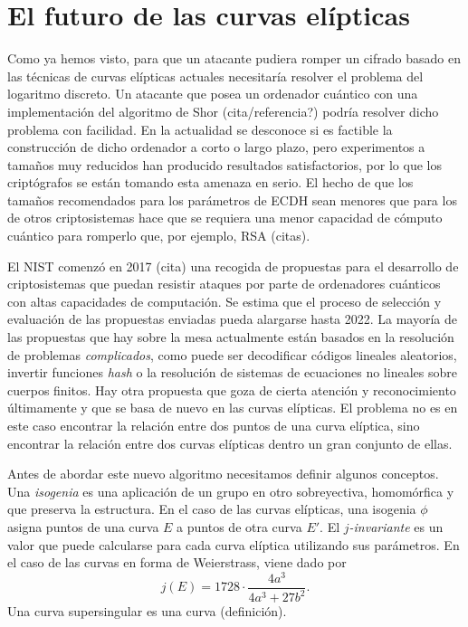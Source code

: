 \documentclass[
  a4paper,
  12pt,
  spanish,
]{scrartcl}
\begin{document}
\section{El futuro de las curvas elípticas}

Como ya hemos visto, para que un atacante pudiera romper un cifrado basado en las técnicas de curvas elípticas actuales necesitaría resolver el problema del logaritmo discreto.
Un atacante que posea un ordenador cuántico con una implementación del algoritmo de Shor (cita/referencia?) podría resolver dicho problema con facilidad. 
En la actualidad se desconoce si es factible la construcción de dicho ordenador a corto o largo plazo, pero experimentos a tamaños muy reducidos han producido resultados satisfactorios, por lo que los criptógrafos se están tomando esta amenaza en serio.
El hecho de que los tamaños recomendados para los parámetros de ECDH sean menores que para los de otros criptosistemas hace que se requiera una menor capacidad de cómputo cuántico para romperlo que, por ejemplo, RSA (citas).

El NIST comenzó en 2017 (cita) una recogida de propuestas para el desarrollo de criptosistemas que puedan resistir ataques por parte de ordenadores cuánticos con altas capacidades de computación.
Se estima que el proceso de selección y evaluación de las propuestas enviadas pueda alargarse hasta 2022.
La mayoría de las propuestas que hay sobre la mesa actualmente están basados en la resolución de problemas \textit{complicados}, como puede ser decodificar códigos lineales aleatorios, invertir funciones \textit{hash} o la resolución de sistemas de ecuaciones no lineales sobre cuerpos finitos.
Hay otra propuesta que goza de cierta atención y reconocimiento últimamente y que se basa de nuevo en las curvas elípticas.
El problema no es en este caso encontrar la relación entre dos puntos de una curva elíptica, sino encontrar la relación entre dos curvas elípticas dentro un gran conjunto de ellas.

Antes de abordar este nuevo algoritmo necesitamos definir algunos conceptos.
Una \textit{isogenia} es una aplicación de un grupo en otro sobreyectiva, homomórfica y que preserva la estructura.
En el caso de las curvas elípticas, una isogenia \(\phi\) asigna puntos de una curva \(E\) a puntos de otra curva \(E'\).
El \(j\)\textit{-invariante} es un valor que puede calcularse para cada curva elíptica utilizando sus parámetros. En el caso de las curvas en forma de Weierstrass, viene dado por \[
  j(E) = 1728 \cdot \frac{4a^3}{4a^3 + 27b^2}.
\]
Una curva supersingular es una curva (definición).
\end{document}
